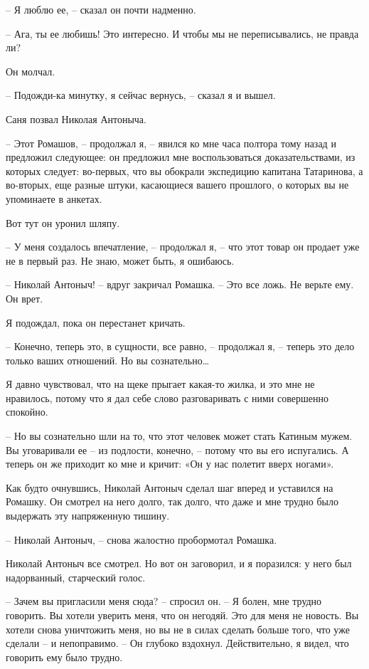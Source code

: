 \documentclass{bmstu}
\begin{document}
– Я люблю ее, – сказал он почти надменно.

– Ага, ты ее любишь! Это интересно. И чтобы мы не переписывались, не правда ли?

Он молчал.

– Подожди-ка минутку, я сейчас вернусь, – сказал я и вышел.

Саня позвал Николая Антоныча.

– Этот Ромашов, – продолжал я, – явился ко мне часа полтора тому назад и
предложил следующее: он предложил мне воспользоваться доказательствами, из
которых следует: во-первых, что вы обокрали экспедицию капитана Татаринова, а
во-вторых, еще разные штуки, касающиеся вашего прошлого, о которых вы не
упоминаете в анкетах.

Вот тут он уронил шляпу.

– У меня создалось впечатление, – продолжал я, – что этот товар он продает уже
не в первый раз. Не знаю, может быть, я ошибаюсь.

– Николай Антоныч! – вдруг закричал Ромашка. – Это все ложь. Не верьте ему. Он
врет.

Я подождал, пока он перестанет кричать.

– Конечно, теперь это, в сущности, все равно, – продолжал я, – теперь это дело
только ваших отношений. Но вы сознательно…

Я давно чувствовал, что на щеке прыгает какая-то жилка, и это мне не нравилось,
потому что я дал себе слово разговаривать с ними совершенно спокойно.

– Но вы сознательно шли на то, что этот человек может стать Катиным мужем. Вы
уговаривали ее – из подлости, конечно, – потому что вы его испугались. А теперь
он же приходит ко мне и кричит: «Он у нас полетит вверх ногами».

Как будто очнувшись, Николай Антоныч сделал шаг вперед и уставился на Ромашку.
Он смотрел на него долго, так долго, что даже и мне трудно было выдержать эту
напряженную тишину.

– Николай Антоныч, – снова жалостно пробормотал Ромашка.

Николай Антоныч все смотрел. Но вот он заговорил, и я поразился: у него был
надорванный, старческий голос.

– Зачем вы пригласили меня сюда? – спросил он. – Я болен, мне трудно говорить.
Вы хотели уверить меня, что он негодяй. Это для меня не новость. Вы хотели снова
уничтожить меня, но вы не в силах сделать больше того, что уже сделали – и
непоправимо. – Он глубоко вздохнул. Действительно, я видел, что говорить ему
было трудно.
\end{document}
